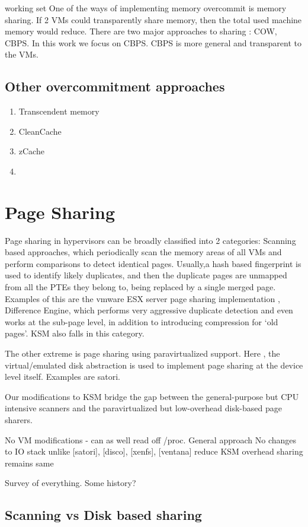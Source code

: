 \documentclass[11pt]{article}
\begin{document}
working set
One of the ways of implementing memory overcommit is memory sharing. If 2 VMs could transparently share memory, then the total used machine memory would reduce.
There are two major approaches to sharing : COW, CBPS. 
In this work we focus on CBPS. CBPS is more general and transparent to the VMs. 
\subsection{Other overcommitment approaches}
\label{sec-2_2}


\begin{enumerate}
\item Transcendent memory
\item CleanCache
\item zCache
\item 
\end{enumerate}
\section{Page Sharing}
\label{sec-3}

Page sharing in hypervisors can be broadly classified into 2 categories: Scanning based approaches, which periodically scan the memory areas of all VMs and perform comparisons to detect identical pages. 
Usually,a hash based fingerprint is used to identify likely duplicates, and then the duplicate pages are unmapped from all the PTEs they belong to, being replaced by a single merged page.
Examples of this are the vmware ESX server page sharing implementation , Difference Engine, which performs very aggressive duplicate detection and even works at the sub-page level, in addition to introducing compression for `old pages'. KSM also falls in this category.

The other extreme is page sharing using paravirtualized support. Here , the virtual/emulated disk abstraction is used to implement page sharing at the device level itself. Examples are satori.

Our modifications to KSM bridge the gap between the general-purpose but CPU intensive scanners and the paravirtualized but low-overhead disk-based page sharers.

No VM modifications - can as well read off /proc. 
General approach
No changes to IO stack unlike [satori], [disco], [xenfs], [ventana]
reduce KSM overhead
sharing remains same

Survey of everything. Some history?
\subsection{Scanning vs Disk based sharing}
\label{sec-3_1}
\end{document}
